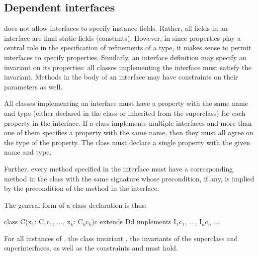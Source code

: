 
\subsection{Dependent interfaces}

\java{} does not allow interfaces to specify instance fields.  Rather, all
fields in an interface are final static fields (constants).
However, in \Xten{}
since properties play a central role in the specification of
refinements of a type, it makes sense to permit interfaces to specify
properties.
Similarly, an interface
definition may specify an invariant on its properties: all
classes implementing the interface must satisfy the invariant.  Methods
in the body of an interface may have constraints on their
parameters as well.

All classes implementing an interface must have a property
with the same name and
type (either declared in the class or inherited from the superclass)
for each property in the interface. If a class implements
multiple interfaces and more than one of them specifies a property
with the same name, then they must all agree on the type of the
property. The class must declare a single property with the given name
and type.

Further, every method specified in the interface must have a
corresponding method in the class with the same signature whose
precondition, if any, is implied by the precondition of the method in
the interface.

The general form of a class declaration is thus:
\begin{xten}
class C(x$_1$: C$_1${c$_1$}, ..., x$_k$: C$_k${c$_k$}){c}
  extends D{d}
  implements I$_1${c$_1$}, ..., I$_n${c$_n$} {...}
\end{xten}
\noindent
For all instances of , the class invariant ,
the invariants of the superclass and superinterfaces,
as well as the constraints  and  must hold.

